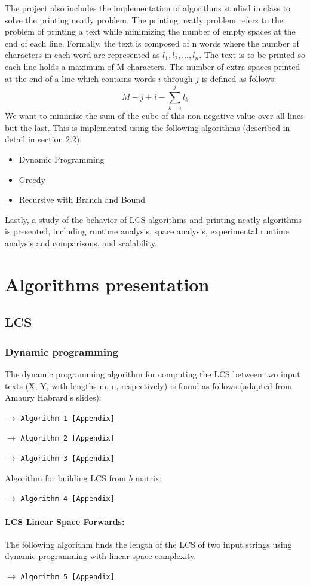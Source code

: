 \documentclass[a4paper,12pt]{article}
\newcommand{\see}[1]{\begin{flushright}$\rightarrow$ \texttt{#1 [Appendix]}\end{flushright}}
\newcommand{\seeAlgorithm}[1]{\see{Algorithm #1}}
\begin{document}
		The project also includes the implementation of algorithms studied in class to solve the printing neatly problem. The printing neatly problem refers to the problem of printing a text while minimizing the number of empty spaces at the end of each line. Formally, the text is composed of n words where the number of characters in each word are represented as $l_1, l_2,\hdots, l_n$. The text is to be printed so each line holds a maximum of M characters. The number of extra spaces printed at the end of a line which contains words $i$ through $j$ is defined as follows:
		$$ M - j + i - \sum_{k=i}^j l_k $$
		We want to minimize the sum of the cube of this non-negative value over all lines but the last. This is implemented using the following algorithms (described in detail in section 2.2):
		\begin{itemize}
			\item Dynamic Programming
			\item Greedy 
			\item Recursive with Branch and Bound
		\end{itemize}

		Lastly, a study of the behavior of LCS algorithms and printing neatly algorithms is presented, including runtime analysis, space analysis, experimental runtime analysis and comparisons, and scalability.

	\newpage
	\section{Algorithms presentation}
		\subsection{LCS}

			\subsubsection{Dynamic programming} The dynamic programming algorithm for computing the LCS between two input texts (X, Y, with lengths m, n, respectively) is found as follows (adapted from Amaury Habrard’s slides): \\
				\seeAlgorithm{1}
				\seeAlgorithm{2}
				\seeAlgorithm{3}

				Algorithm for building LCS from $b$ matrix:
				\seeAlgorithm{4}

				\paragraph{LCS Linear Space Forwards:} The following algorithm finds the length of the LCS of two input strings using dynamic programming with linear space complexity.
					\seeAlgorithm{5}
\end{document}
